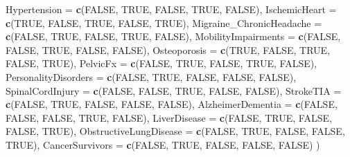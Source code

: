 \documentclass[
]{article}
\newenvironment{Shaded}{\begin{snugshade}}{\end{snugshade}}
\newcommand{\AttributeTok}[1]{\textcolor[rgb]{0.13,0.29,0.53}{#1}}
\newcommand{\ConstantTok}[1]{\textcolor[rgb]{0.56,0.35,0.01}{#1}}
\newcommand{\FunctionTok}[1]{\textcolor[rgb]{0.13,0.29,0.53}{\textbf{#1}}}
\newcommand{\NormalTok}[1]{#1}
\begin{document}
\begin{Shaded}
\begin{Highlighting}[]
  \AttributeTok{Hypertension =} \FunctionTok{c}\NormalTok{(}\ConstantTok{FALSE}\NormalTok{, }\ConstantTok{TRUE}\NormalTok{, }\ConstantTok{FALSE}\NormalTok{, }\ConstantTok{TRUE}\NormalTok{, }\ConstantTok{FALSE}\NormalTok{),}
  \AttributeTok{IschemicHeart =} \FunctionTok{c}\NormalTok{(}\ConstantTok{TRUE}\NormalTok{, }\ConstantTok{FALSE}\NormalTok{, }\ConstantTok{TRUE}\NormalTok{, }\ConstantTok{FALSE}\NormalTok{, }\ConstantTok{TRUE}\NormalTok{),}
  \AttributeTok{Migraine\_ChronicHeadache =} \FunctionTok{c}\NormalTok{(}\ConstantTok{FALSE}\NormalTok{, }\ConstantTok{TRUE}\NormalTok{, }\ConstantTok{FALSE}\NormalTok{, }\ConstantTok{TRUE}\NormalTok{, }\ConstantTok{FALSE}\NormalTok{),}
  \AttributeTok{MobilityImpairments =} \FunctionTok{c}\NormalTok{(}\ConstantTok{FALSE}\NormalTok{, }\ConstantTok{FALSE}\NormalTok{, }\ConstantTok{TRUE}\NormalTok{, }\ConstantTok{FALSE}\NormalTok{, }\ConstantTok{FALSE}\NormalTok{),}
  \AttributeTok{Osteoporosis =} \FunctionTok{c}\NormalTok{(}\ConstantTok{TRUE}\NormalTok{, }\ConstantTok{FALSE}\NormalTok{, }\ConstantTok{TRUE}\NormalTok{, }\ConstantTok{FALSE}\NormalTok{, }\ConstantTok{TRUE}\NormalTok{),}
  \AttributeTok{PelvicFx =} \FunctionTok{c}\NormalTok{(}\ConstantTok{FALSE}\NormalTok{, }\ConstantTok{TRUE}\NormalTok{, }\ConstantTok{FALSE}\NormalTok{, }\ConstantTok{TRUE}\NormalTok{, }\ConstantTok{FALSE}\NormalTok{),}
  \AttributeTok{PersonalityDisorders =} \FunctionTok{c}\NormalTok{(}\ConstantTok{FALSE}\NormalTok{, }\ConstantTok{TRUE}\NormalTok{, }\ConstantTok{FALSE}\NormalTok{, }\ConstantTok{FALSE}\NormalTok{, }\ConstantTok{FALSE}\NormalTok{),}
  \AttributeTok{SpinalCordInjury =} \FunctionTok{c}\NormalTok{(}\ConstantTok{FALSE}\NormalTok{, }\ConstantTok{FALSE}\NormalTok{, }\ConstantTok{TRUE}\NormalTok{, }\ConstantTok{FALSE}\NormalTok{, }\ConstantTok{FALSE}\NormalTok{),}
  \AttributeTok{StrokeTIA =} \FunctionTok{c}\NormalTok{(}\ConstantTok{FALSE}\NormalTok{, }\ConstantTok{TRUE}\NormalTok{, }\ConstantTok{FALSE}\NormalTok{, }\ConstantTok{FALSE}\NormalTok{, }\ConstantTok{FALSE}\NormalTok{),}
  \AttributeTok{AlzheimerDementia =} \FunctionTok{c}\NormalTok{(}\ConstantTok{FALSE}\NormalTok{, }\ConstantTok{FALSE}\NormalTok{, }\ConstantTok{FALSE}\NormalTok{, }\ConstantTok{TRUE}\NormalTok{, }\ConstantTok{FALSE}\NormalTok{),}
  \AttributeTok{LiverDisease =} \FunctionTok{c}\NormalTok{(}\ConstantTok{FALSE}\NormalTok{, }\ConstantTok{TRUE}\NormalTok{, }\ConstantTok{FALSE}\NormalTok{, }\ConstantTok{FALSE}\NormalTok{, }\ConstantTok{TRUE}\NormalTok{),}
  \AttributeTok{ObstructiveLungDisease =} \FunctionTok{c}\NormalTok{(}\ConstantTok{FALSE}\NormalTok{, }\ConstantTok{TRUE}\NormalTok{, }\ConstantTok{FALSE}\NormalTok{, }\ConstantTok{FALSE}\NormalTok{, }\ConstantTok{TRUE}\NormalTok{),}
  \AttributeTok{CancerSurvivors =} \FunctionTok{c}\NormalTok{(}\ConstantTok{FALSE}\NormalTok{, }\ConstantTok{TRUE}\NormalTok{, }\ConstantTok{FALSE}\NormalTok{, }\ConstantTok{FALSE}\NormalTok{, }\ConstantTok{FALSE}\NormalTok{)}
\NormalTok{)}


\end{Highlighting}
\end{Shaded}
\end{document}
